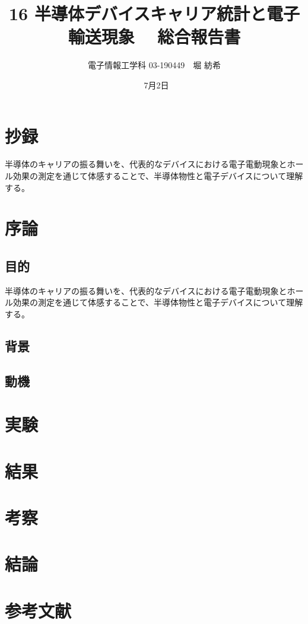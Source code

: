 \documentclass[dvipdfmx]{jsarticle}
\begin{document}
\title{16 半導体デバイスキャリア統計と電子輸送現象　 総合報告書}
\author{電子情報工学科 03-190449　堀 紡希}
\date{\ 7月2日}
\maketitle


\section{抄録}
半導体のキャリアの振る舞いを、代表的なデバイスにおける電子電動現象とホール効果の測定を通じて体感することで、半導体物性と電子デバイスについて理解する。
\section{序論}
\subsection{目的}
半導体のキャリアの振る舞いを、代表的なデバイスにおける電子電動現象とホール効果の測定を通じて体感することで、半導体物性と電子デバイスについて理解する。
\subsection{背景}

\subsection{動機}

\section{実験}

\section{結果}

\section{考察}

\section{結論}

\section{参考文献}
\end{document}
